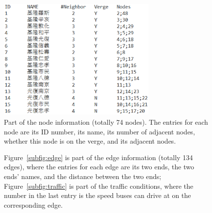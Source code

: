 \documentclass{sig-alternate}
\begin{document}
\begin{figure}
\centering
\includegraphics[height=2.4in, width=3.1in]{node.eps}
\caption{Part of the node information (totally 74 nodes). The entries for each node are its ID number, its name, its number of adjacent nodes, whether this node is on the verge, and its adjacent nodes.}
\label{fig:node}
\end{figure}

\begin{figure}
\centering
{}
\caption{Figure~\ref{subfig:edge} is part of the edge information (totally 134 edges), where the entries for each edge are its two ends, the two ends' names, and the distance between the two ends; Figure~\ref{subfig:traffic} is part of the traffic conditions, where the
number in the last entry is the speed buses can drive at on the corresponding edge.}
\label{fig:edge}
\end{figure}
\end{document}
